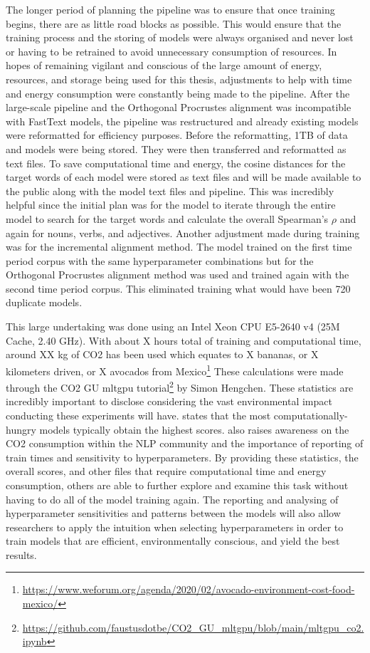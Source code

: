 The longer period of planning the pipeline was to ensure that once training begins, there are as little road blocks as possible. This would ensure that the training process and the storing of models were always organised and never lost or having to be retrained to avoid unnecessary consumption of resources. In hopes of remaining vigilant and conscious of the large amount of energy, resources, and storage being used for this thesis, adjustments to help with time and energy consumption were constantly being made to the pipeline. After the large-scale pipeline and the Orthogonal Procrustes alignment was incompatible with FastText models, the pipeline was restructured and already existing models were reformatted for efficiency purposes. Before the reformatting, 1TB of data and models were being stored. They were then transferred and reformatted as text files. To save computational time and energy, the cosine distances for the target words of each model were stored as text files and will be made available to the public along with the model text files and pipeline. This was incredibly helpful since the initial plan was for the model to iterate through the entire model to search for the target words and calculate the overall Spearman’s $\rho$ and again for nouns, verbs, and adjectives. Another adjustment made during training was for the incremental alignment method. The model trained on the first time period corpus with the same hyperparameter combinations but for the Orthogonal Procrustes alignment method was used and trained again with the second time period corpus. This eliminated training what would have been 720 duplicate models.  

This large undertaking was done using an Intel Xeon CPU E5-2640 v4 (25M Cache, 2.40 GHz). With about X hours total of training and computational time, around XX kg of CO2 has been used which equates to X bananas, or X kilometers driven, or X avocados from Mexico\footnote{\url{https://www.weforum.org/agenda/2020/02/avocado-environment-cost-food-mexico/}} These calculations were made through the CO2 GU mltgpu tutorial\footnote{\url{https://github.com/faustusdotbe/CO2_GU_mltgpu/blob/main/mltgpu_co2.ipynb}} by Simon Hengchen. These statistics are incredibly important to disclose considering the vast environmental impact conducting these experiments will have. 
\citet{strubell-etal-2019-energy} states that the most computationally-hungry models typically obtain the highest scores. \citet{strubell-etal-2019-energy} also raises awareness on the CO2 consumption within the NLP community and the importance of reporting of train times and sensitivity to hyperparameters. By providing these statistics, the overall scores, and other files that require computational time and energy consumption, others are able to  further explore and examine this task without having to do all of the model training again. The reporting and analysing of hyperparameter sensitivities and patterns between the models will also allow researchers to apply the intuition when selecting hyperparameters in order to train models that are efficient, environmentally conscious, and yield the best results.

